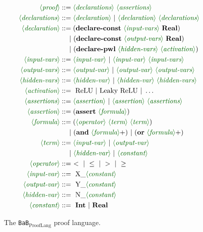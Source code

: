 \documentclass[oneside,11pt,dvipsnames]{book}
\numberwithin{equation}{section}
\theoremstyle{definition}
\theoremstyle{remark}
\newcommand{\prooflang}{\texttt{BaB$_{\text{ProofLang}}$}}
\begin{document}
\begin{figure}
{\small
\begin{align*}
    \lra{proof}         &::= \lra{declarations} \ \lra{assertions} \\
    \lra{declarations}  &::= \lra{declaration} \ | \ \lra{declaration} \ \lra{declarations} \\
    \lra{declaration}   &::= (\textbf{declare-const} \ \lra{input-vars} \ \textbf{Real}) \\
                        & \quad ~| \ (\textbf{declare-const} \ \lra{output-vars} \ \textbf{Real}) \\
                        & \quad ~| \ (\textbf{declare-pwl} \ \lra{hidden-vars} \ \lra{activation}) \\
    \lra{input-vars}    &::= \lra{input-var} \ | \ \lra{input-var} \ \lra{input-vars} \\
    \lra{output-vars}    &::= \lra{output-var} \ | \ \lra{output-var} \ \lra{output-vars} \\
    \lra{hidden-vars}    &::= \lra{hidden-var} \ | \ \lra{hidden-var} \ \lra{hidden-vars} \\
    \lra{activation}    &::= ~\text{ReLU} \ | \ \text{Leaky ReLU} \ | \ \ldots \\
    \lra{assertions}    &::= \lra{assertion} \ | \ \lra{assertion} \ \lra{assertions} \\
    \lra{assertion}     &::= (\textbf{assert} \ \lra{formula}) \\
    \lra{formula}       &::= (\lra{operator} \ \lra{term} \ \lra{term}) \\
                        & \quad ~| \ (\textbf{and} \ \lra{formula}+) \ | \ (\textbf{or} \ \lra{formula}+) \\
    \lra{term}          &::= \lra{input-var} \ | \ \lra{output-var} \\ 
                        & \quad ~| \ \lra{hidden-var} \ | \ \lra{constant} \\
    \lra{operator}      &::= ~ < \ | \ \leq \ | \ > \ | \ \geq \\
    \lra{input-var}     &::= ~\text{X\_}\lra{constant} \\
    \lra{output-var}    &::= ~\text{Y\_}\lra{constant} \\
    \lra{hidden-var}    &::= ~\text{N\_}\lra{constant} \\
    \lra{constant}      &::= ~\textbf{Int} \ | \ \textbf{Real}
\end{align*}
}
\caption{The \prooflang{} proof language.}\label{fig:grammar}
\end{figure}
\end{document}
